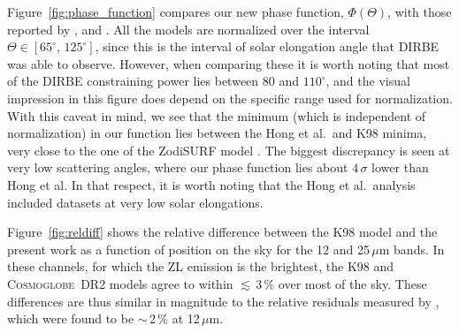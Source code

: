 \documentclass[twocolumn]{aa}
\newcommand{\cosmoglobe}{\textsc{Cosmoglobe}}
\begin{document}

Figure~\ref{fig:phase_function} compares our new phase function, $\Phi(\Theta)$, 
with those reported by \citet{kelsall1998}, \citet{Hong} and \citet{skysurf}. All the models are 
normalized over the interval $\Theta \in [65^\circ,\,125^\circ]$, since this is the interval of 
solar elongation angle that DIRBE was able to observe. However, when comparing these 
it is worth noting that most of the DIRBE constraining power lies between 80 and $110^{\circ}$, 
and the visual impression in this figure does depend on the specific range used for normalization. 
With this caveat in mind, we see that the minimum (which is independent of normalization) 
in our function lies between the Hong et al.\ and K98 minima, very close to the one of 
the ZodiSURF model \citep{skysurf}. The biggest discrepancy is 
seen at very low scattering angles, where our phase function lies about $4\,\sigma$ lower 
than Hong et al. In that respect, it is worth noting that the Hong et al.\ analysis included 
datasets at very low solar elongations. 



Figure~\ref{fig:reldiff} shows the relative difference between the K98 model 
and the present work as a function of position on the sky for the 12 and 25\,$\mu$m
bands. In these channels, for which the ZL emission is the
brightest, the K98 and \cosmoglobe\ DR2 models agree to within
$\lesssim$\,3\,\% over most of the sky. These differences are thus 
similar in magnitude to the relative residuals measured by
\citet{kelsall1998}, which were found to be $\sim$\,2\,\% at
12\,$\mu$m.
\end{document}
